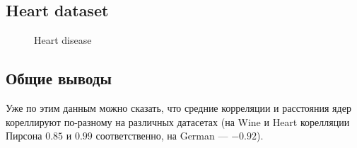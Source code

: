 \documentclass[12pt,twoside]{article}
\begin{document}



\newpage

\subsection{Heart dataset}

\begin{figure}[H]
      \caption{Heart disease}
\end{figure}



\subsection{Общие выводы}

Уже по этим данным можно сказать, что средние корреляции и расстояния ядер кореллируют по-разному на различных датасетах (на Wine и Heart корелляции Пирсона $0.85$ и $0.99$ соответственно, на German --- $-0.92$).






\end{document}
